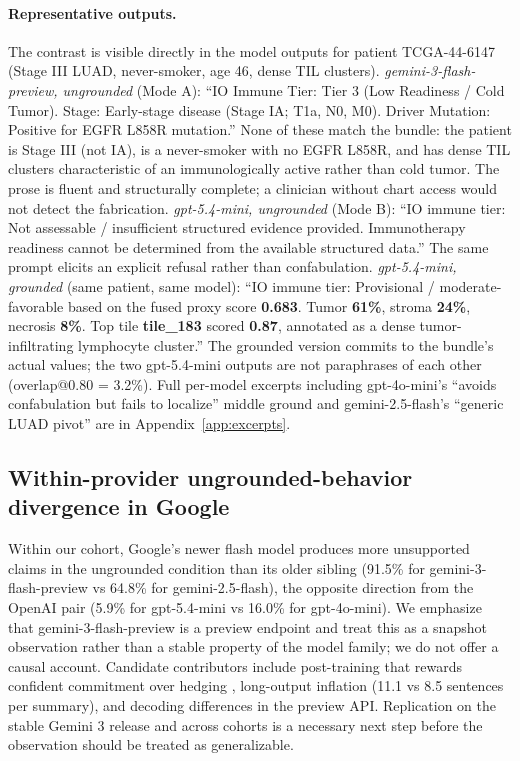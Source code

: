 \documentclass{article}
\theoremstyle{plain}
\begin{document}
\paragraph{Representative outputs.}
The contrast is visible directly in the model outputs for patient TCGA-44-6147 (Stage III LUAD, never-smoker, age 46, dense TIL clusters). \emph{gemini-3-flash-preview, ungrounded} (Mode A): ``IO Immune Tier: Tier 3 (Low Readiness / Cold Tumor). Stage: Early-stage disease (Stage IA; T1a, N0, M0). Driver Mutation: Positive for EGFR L858R mutation.'' None of these match the bundle: the patient is Stage III (not IA), is a never-smoker with no EGFR L858R, and has dense TIL clusters characteristic of an immunologically active rather than cold tumor. The prose is fluent and structurally complete; a clinician without chart access would not detect the fabrication. \emph{gpt-5.4-mini, ungrounded} (Mode B): ``IO immune tier: Not assessable / insufficient structured evidence provided. Immunotherapy readiness cannot be determined from the available structured data.'' The same prompt elicits an explicit refusal rather than confabulation. \emph{gpt-5.4-mini, grounded} (same patient, same model): ``IO immune tier: Provisional / moderate-favorable based on the fused proxy score \textbf{0.683}. Tumor \textbf{61\%}, stroma \textbf{24\%}, necrosis \textbf{8\%}. Top tile \textbf{tile\_183} scored \textbf{0.87}, annotated as a dense tumor-infiltrating lymphocyte cluster.'' The grounded version commits to the bundle's actual values; the two gpt-5.4-mini outputs are not paraphrases of each other (overlap@0.80 = 3.2\%). Full per-model excerpts including gpt-4o-mini's ``avoids confabulation but fails to localize'' middle ground and gemini-2.5-flash's ``generic LUAD pivot'' are in Appendix~\ref{app:excerpts}.

\subsection{Within-provider ungrounded-behavior divergence in Google}

Within our cohort, Google's newer flash model produces more unsupported claims in the ungrounded condition than its older sibling (91.5\% for gemini-3-flash-preview vs 64.8\% for gemini-2.5-flash), the opposite direction from the OpenAI pair (5.9\% for gpt-5.4-mini vs 16.0\% for gpt-4o-mini). We emphasize that gemini-3-flash-preview is a preview endpoint and treat this as a snapshot observation rather than a stable property of the model family; we do not offer a causal account. Candidate contributors include post-training that rewards confident commitment over hedging \citep{ouyang2022training}, long-output inflation (11.1 vs 8.5 sentences per summary), and decoding differences in the preview API. Replication on the stable Gemini 3 release and across cohorts is a necessary next step before the observation should be treated as generalizable.
\end{document}

